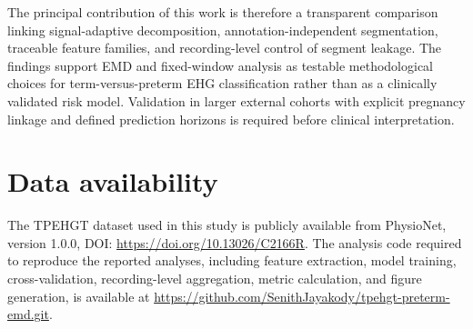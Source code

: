 \documentclass[10pt,letterpaper]{article}
\begin{document}
The principal contribution of this work is therefore a transparent comparison linking signal-adaptive decomposition, annotation-independent segmentation, traceable feature families, and recording-level control of segment leakage. The findings support EMD and fixed-window analysis as testable methodological choices for term-versus-preterm EHG classification rather than as a clinically validated risk model. Validation in larger external cohorts with explicit pregnancy linkage and defined prediction horizons is required before clinical interpretation.

\section*{Data availability}

The TPEHGT dataset used in this study is publicly available from PhysioNet, version 1.0.0, DOI: \url{https://doi.org/10.13026/C2166R}. The analysis code required to reproduce the reported analyses, including feature extraction, model training, cross-validation, recording-level aggregation, metric calculation, and figure generation, is available at \url{https://github.com/SenithJayakody/tpehgt-preterm-emd.git}.









\end{document}
